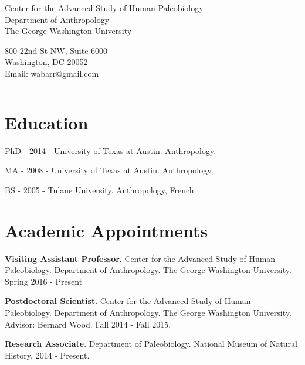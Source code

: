 \documentclass{article}
\begin{document}
\begin{center}
\end{center}

\vspace{15pt}

\noindent\begin{minipage}{.60\textwidth}
\begin{flushleft}
Center for the Advanced Study of Human Paleobiology\\
Department of Anthropology\\
The George Washington University\\
\end{flushleft}
\end{minipage}
\begin{minipage}{.395\textwidth}
\begin{flushright}
800 22nd St NW, Suite 6000\\
Washington, DC 20052 \\
Email: wabarr@gmail.com\\
\end{flushright}
\end{minipage}


\noindent\rule[-2mm]{\textwidth}{1pt}

\section*{Education}
\begin{description*}
\item[] PhD - 2014 - University of Texas at Austin. Anthropology.
\item[] MA  - 2008 - University of Texas at Austin. Anthropology.
\item[] BS  - 2005 - Tulane University. Anthropology, French.
\end{description*}


\section*{Academic Appointments}
\begin{description*}
\item[] {\bfseries Visiting Assistant Professor}. Center for the Advanced Study of Human Paleobiology. Department of Anthropology. The George Washington University. Spring 2016 - Present
\item[] {\bfseries Postdoctoral Scientist}. Center for the Advanced Study of Human Paleobiology. Department of Anthropology. The George Washington University. Advisor: Bernard Wood. Fall 2014 - Fall 2015.
\item[] {\bfseries Research Associate}. Department of Paleobiology.  National Museum of Natural History. 2014 - Present.
\end{description*}
\end{document}
